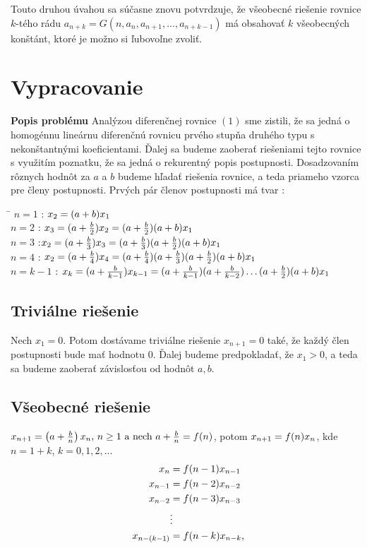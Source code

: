 \documentclass[a4paper,10pt]{article}
\theoremstyle{plain}
\theoremstyle{definition}
\begin{document}
Touto druhou úvahou sa súčasne znovu potvrdzuje, že všeobecné riešenie rovnice $k$-tého rádu 
$a_{n+k} = G(n, a_{n}, a_{n+1}, \ldots, a_{n+k-1})$ má obsahovať
$k$ všeobecných konštánt, ktoré je možno si ľubovoľne zvoliť.

\newpage
\section{Vypracovanie}
\textbf{Popis problému}\newline
Analýzou diferenčnej rovnice $ (1) $ sme zistili, že sa jedná o homogénnu lineárnu diferenčnú rovnicu prvého stupňa druhého typu s nekonštantnými koeficientami. Ďalej sa budeme zaoberať riešeniami tejto rovnice s využitím poznatku, že sa jedná o rekurentný popis postupnosti. Dosadzovaním rôznych hodnôt za $ a $ a $ b $ budeme hľadať riešenia rovnice, a teda priameho vzorca pre členy postupnosti. \newline\newline
Prvých pár členov postupnosti má tvar : 
\begin{spacing}{1.4}
\begin{tabbing}
\hspace{2cm}\=\kill
 $n=1$ :\> $x_{2}= (a+b)\*x_{1}$\\ 
 $n=2$ :\>  $x_{3}=(a+\frac{b}{2})\*x_{2}=(a+\frac{b}{2})(a+b)\*x_{1}$ \\ 
 $n=3$ :\>$x_{2}=(a+\frac{b}{3})\*x_{3}=(a+\frac{b}{3})\*(a+\frac{b}{2})(a+b)\*x_{1}$\\
 $n=4$ :\> $x_{2}=(a+\frac{b}{4})\*x_{4}=(a+\frac{b}{4})\*(a+\frac{b}{3})\*(a+\frac{b}{2})
 (a+b)\*x_{1}$\\ 
  $n=k-1$ :\> $x_{k}=(a+\frac{b}{k-1})\*x_{k-1}=(a+\frac{b}{k-1})\*(a+\frac{b}{k-2})\ldots(a+\frac{b}{2})\*(a+b)\*x_{1}$
\end{tabbing} 
\end{spacing}
 

\subsection{Triviálne riešenie}
Nech $x_{1}=0$.\newline
 Potom dostávame triviálne riešenie $x_{n+1} = 0$ také, že každý člen postupnosti bude mať hodnotu $0$. Ďalej budeme predpokladať, že $ x_{1} > 0 $, a teda sa budeme 
zaoberať závislosťou od hodnôt $ a,b $.

\subsection{Všeobecné riešenie}
$x_{n+1}=\left(a+{\frac{b}{n}}\right)\*x_{n} \text{, } n \geq 1 \text{ a nech } a + {\frac{b}{n}} = f(n)$, potom
$x_{n+1}=f(n)\*x_{n}   $, kde $ n = 1 + k $, $ k = 0,1,2,... $
\begin{align*}
x_{n}&=f(n-1)\*x_{n-1}    \\
x_{n-1}&=f(n-2)\*x_{n-2}    \\
x_{n-2}&=f(n-3)\*x_{n-3}    \\
&\vdots \\
x_{n-(k-1)}&=f(n-k)\*x_{n-k}\text{,}    
\end{align*}
\end{document}
